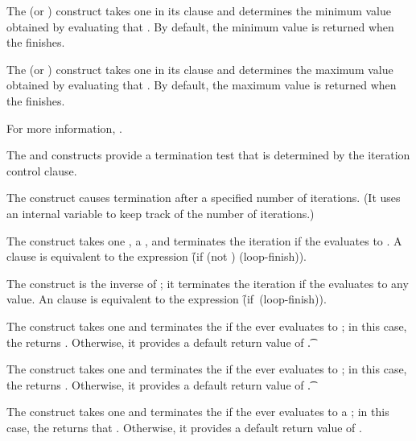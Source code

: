 The  (or ) construct
takes one  in its clause 
and determines the minimum value obtained by evaluating that .
By default, the minimum value is returned when the  finishes.
 
The  (or ) construct
takes one  in its clause 
and determines the maximum value obtained by evaluating that .
By default, the maximum value is returned when the  finishes.

For more information, \seesection\LOOPValAcc.

\endsubsubsubsection%

 
The  and  constructs provide a termination test
that is determined by the iteration control clause.
 
The  construct causes termination after a specified
number of iterations.
(It uses an internal variable to keep track of the number of iterations.)
 
The  construct takes one , a , 
and terminates the iteration if the  evaluates to .
A  clause is equivalent to the expression 
\f{(if (not ) (loop-finish))}.
 
The  construct is the inverse of ;
it terminates the iteration if the  evaluates to
any  value.
An  clause is equivalent to the expression
\hbox{\f{(if  (loop-finish))}}.
 
The  construct takes one  and
terminates the  if the  ever evaluates to ;
in this case, the   returns \nil.
Otherwise, it provides a default return value of \t.
 
The  construct takes one  and
terminates the  if the  ever evaluates to ;
in this case, the   returns \nil.
Otherwise, it provides a default return value of \t.
 
The  construct takes one  and
terminates the  if the  ever evaluates to
a  ;
in this case, the   returns that .
Otherwise, it provides a default return value of \nil.

